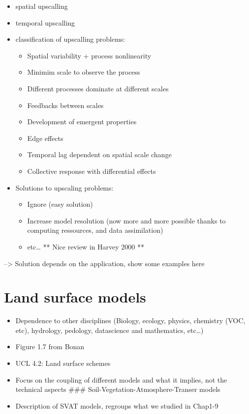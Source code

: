 \documentclass[
  oneside]{book}
\providecommand{\tightlist}{%
  \setlength{\itemsep}{0pt}\setlength{\parskip}{0pt}}
\begin{document}
\begin{itemize}
\tightlist
\item
  spatial upscalling
\item
  temporal upscalling
\item
  classification of upscalling problems:

  \begin{itemize}
  \tightlist
  \item
    Spatial variability + process nonlinearity
  \item
    Minimim scale to observe the process
  \item
    Different processes dominate at different scales
  \item
    Feedbacks between scales
  \item
    Development of emergent properties
  \item
    Edge effects
  \item
    Temporal lag dependent on spatial scale change
  \item
    Collective response with differential effects
  \end{itemize}
\item
  Solutions to upscaling problems:

  \begin{itemize}
  \tightlist
  \item
    Ignore (easy solution)
  \item
    Increase model resolution (now more and more possible thanks to computing ressources, and data assimilation)
  \item
    etc\ldots{} ** Nice review in Harvey 2000 **
  \end{itemize}
\end{itemize}

--\textgreater{} Solution depends on the application, show some examples here

\hypertarget{land-surface-models}{%
\section{Land surface models}\label{land-surface-models}}

\begin{itemize}
\tightlist
\item
  Dependence to other disciplines (Biology, ecology, physics, chemistry (VOC, etc), hydrology, pedology, datascience and mathematics, etc\ldots)
\item
  Figure 1.7 from Bonan
\item
  UCL 4.2: Land surface schemes
\item
  Focus on the coupling of different models and what it implies, not the technical aspects
  \#\#\# Soil-Vegetation-Atmosphere-Transer models
\item
  Description of SVAT models, regroups what we studied in Chap1-9
\end{itemize}
\end{document}
